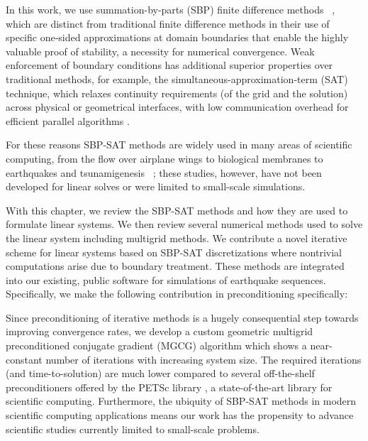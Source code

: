 In this work, we use summation-by-parts (SBP) finite difference
methods ~\citep{KS74, Strand94, MN04, SVARD201417}, which are distinct from traditional finite difference
methods in their use of specific one-sided approximations at domain boundaries that enable the highly valuable proof of stability, a necessity for numerical convergence. Weak enforcement of boundary conditions has additional superior properties over traditional methods, for example, the simultaneous-approximation-term (SAT) technique, which relaxes continuity requirements (of the grid and the solution) across physical or geometrical interfaces, with low communication overhead for efficient parallel algorithms \citep{Fernandez2014}.

For these reasons SBP-SAT methods are widely used in many areas of scientific computing, from the flow over airplane wings to biological membranes to earthquakes and tsunamigenesis ~\citep{Ying2007, NordstromEriksson2010, Swim2011, petersson_stable, Lotto2015, EricksonDay2016}; these studies, however, have not been developed for linear solves or were limited to small-scale simulations. 


With this chapter, we review the SBP-SAT methods and how they are used to formulate linear systems.
We then review several numerical methods used to solve the linear system including multigrid methods.
We contribute a novel iterative scheme for linear systems based on SBP-SAT discretizations where nontrivial computations arise due to boundary treatment. These methods are integrated into our existing, public software for simulations of earthquake sequences. Specifically, we make the following contribution in preconditioning specifically:

Since preconditioning of iterative methods is a hugely consequential step towards improving convergence rates, we develop a custom geometric multigrid preconditioned conjugate gradient (MGCG) algorithm which shows a near-constant number of iterations with increasing system size. The required iterations (and time-to-solution) are much lower compared to several off-the-shelf preconditioners offered by the PETSc library \citep{petsc-web-page}, a state-of-the-art library for scientific computing.
Furthermore, the ubiquity of SBP-SAT methods in modern scientific computing applications means our work has the propensity to advance scientific studies currently limited to small-scale problems.

